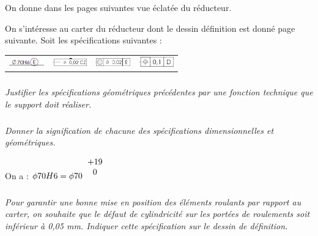 \documentclass[10pt,fleqn]{article} %
\begin{document}
\begin{multicols}{2}
On donne dans les pages suivantes vue éclatée du réducteur.


On s'intéresse au carter du réducteur dont le dessin définition est donné page suivante. 
Soit les spécifications suivantes : 
\begin{center}
\begin{tabular}{cccc}
\includegraphics[width=1.5cm]{images/reducteur_04_a} &
\includegraphics[width=1.5cm]{images/reducteur_04_b} &
\includegraphics[width=1.5cm]{images/reducteur_04_c} &
\includegraphics[width=1.5cm]{images/reducteur_04_d} \\
\end{tabular}
\end{center}

\subparagraph{}\textit{Justifier les spécifications géométriques précédentes par une fonction technique que le support doit réaliser. }

\subparagraph{}\textit{Donner la signification de chacune des spécifications dimensionnelles et géométriques.}

\begin{rem}
On a : $\phi 70 H6 = \phi 70 ^{\begin{tabular}{c}+19 \\ 0\end{tabular}}$
\end{rem}
\subparagraph{}\textit{Pour garantir une bonne mise en position des éléments roulants par rapport au carter, on souhaite que le défaut de cylindricité sur les portées de roulements soit inférieur à 0,05 mm. Indiquer cette spécification sur le dessin de définition.}
\end{multicols}
\end{document}
